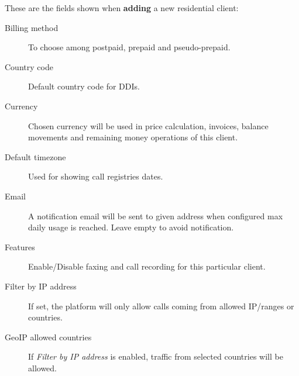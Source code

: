 \documentclass[letterpaper,10pt,english]{sphinxmanual}
\begin{document}
These are the fields shown when \textbf{adding} a new residential client:
\begin{description}
\item[{Billing method}] \leavevmode{}\label{administration_portal/brand/clients/residential:term-billing-method}
To choose among postpaid, prepaid and pseudo-prepaid.

\item[{Country code}] \leavevmode{}\label{administration_portal/brand/clients/residential:term-country-code}
Default country code for DDIs.

\item[{Currency}] \leavevmode{}\label{administration_portal/brand/clients/residential:term-currency}
Chosen currency will be used in price calculation, invoices, balance movements and
remaining money operations of this client.

\item[{Default timezone}] \leavevmode{}\label{administration_portal/brand/clients/residential:term-default-timezone}
Used for showing call registries dates.

\item[{Email}] \leavevmode{}\label{administration_portal/brand/clients/residential:term-email}
A notification email will be sent to given address when configured max daily usage is reached. Leave empty to
avoid notification.

\item[{Features}] \leavevmode{}\label{administration_portal/brand/clients/residential:term-features}
Enable/Disable faxing and call recording for this particular client.

\item[{Filter by IP address}] \leavevmode{}\label{administration_portal/brand/clients/residential:term-filter-by-ip-address}
If set, the platform will only allow calls coming from allowed IP/ranges or countries.

\item[{GeoIP allowed countries}] \leavevmode{}\label{administration_portal/brand/clients/residential:term-geoip-allowed-countries}
If \emph{Filter by IP address} is enabled, traffic from selected countries will be allowed.


\end{description}
\end{document}
